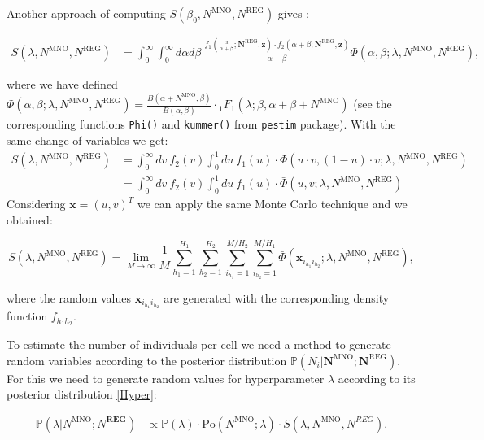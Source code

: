 \documentclass[12pt, a4paper]{article}
\begin{document}
Another approach of computing $S(\beta_{0}, N^{\textrm{MNO}}, N^{\textrm{REG}})$ gives \cite{methodology}:

\begin{align}
S(\lambda, N^{\textrm{MNO}}, N^{\textrm{REG}})&=\int_{0}^{\infty}\int_{0}^{\infty}d\alpha d\beta\ \frac{f_{1}(\frac{\alpha}{\alpha+\beta}; \mathbf{N}^{\textrm{REG}}, \mathbf{z})\cdot f_{2}(\alpha+\beta; \mathbf{N}^{\textrm{REG}}, \mathbf{z})}{\alpha+\beta}\Phi(\alpha, \beta; \lambda, N^{\textrm{MNO}}, N^{\textrm{REG}}),
\end{align}

\noindent where we have defined $\Phi(\alpha, \beta; \lambda, N^{\textrm{MNO}}, N^{\textrm{REG}}) = \frac{B(\alpha + N^{\textrm{MNO}}, \beta)}{B(\alpha, \beta)}\cdot {}_{1}F_{1}(\lambda; \beta, \alpha+\beta +N^{\textrm{MNO}})$ (see the corresponding functions \texttt{Phi()} and \texttt{kummer()} from \texttt{pestim} package). 
With the same change of variables we get:
\begin{align}
S(\lambda, N^{\textrm{MNO}}, N^{\textrm{REG}})&=\int_{0}^{\infty}dv\ f_{2}(v)\int_{0}^{1} du\ f_{1}(u)\cdot \Phi(u\cdot v, (1-u)\cdot v; \lambda, N^{\textrm{MNO}}, N^{\textrm{REG}})\nonumber\\
&=\int_{0}^{\infty}dv\ f_{2}(v)\int_{0}^{1} du\ f_{1}(u) \cdot\bar{\Phi}(u, v; \lambda, N^{\textrm{MNO}}, N^{\textrm{REG}})
\end{align}
Considering $\mathbf{x}=(u,v)^{T}$ we can apply the same Monte Carlo technique and we obtained:

\begin{equation}
S(\lambda, N^{\textrm{MNO}}, N^{\textrm{REG}})=\lim_{M\to\infty}\frac{1}{M}\sum_{h_{1}=1}^{H_{1}}\sum_{h_{2}=1}^{H_{2}}\sum_{i_{h_{1}}=1}^{M/H_{2}}\sum_{i_{h_{2}}=1}^{M/H_{1}}\bar{\Phi}(\mathbf{x}_{i_{h_{1}}i_{h_{2}}}; \lambda, N^{\textrm{MNO}}, N^{\textrm{REG}}),
\end{equation}

\noindent where the random values $\mathbf{x}_{i_{h_{1}}i_{h_{2}}}$ are generated with the corresponding density function $f_{h_{1}h_{2}}$.

To estimate the number of individuals per cell we need a method to generate random variables 
according to the posterior distribution $\mathbb{P}\left(N_{i}|\mathbf{N}^{\textrm{MNO}};\mathbf{N}^{\textrm{REG}}\right)$. 
For this we need to generate random values for 
hyperparameter $\lambda$ according to its posterior distribution \eqref{Hyper}:

\begin{align}
\mathbb{P}\left(\lambda\big|N^{\textrm{MNO}};N^{\textbf{REG}}\right)&\propto\mathbb{P}\left(\lambda\right)\cdot\textrm{Po}(N^{\textrm{MNO}}; \lambda) \cdot S\left(\lambda, N^{\textrm{MNO}}, N^{REG}\right).\nonumber
\end{align}
\end{document}
